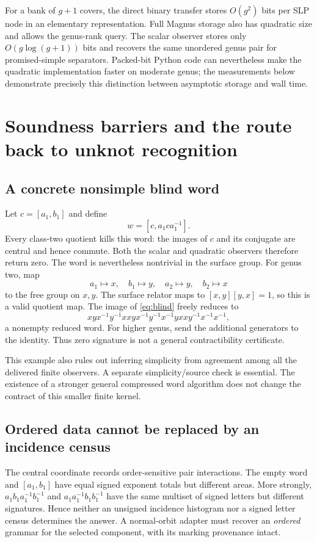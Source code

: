 \documentclass[11pt,letterpaper]{article}
\theoremstyle{definition}
\theoremstyle{remark}
\begin{document}
For a bank of $g+1$ covers, the direct binary transfer stores $O(g^2)$ bits per SLP node in an elementary representation. Full Magnus storage also has quadratic size and allows the genus-rank query. The scalar observer stores only $O(g\log(g+1))$ bits and recovers the same unordered genus pair for promised-simple separators. Packed-bit Python code can nevertheless make the quadratic implementation faster on moderate genus; the measurements below demonstrate precisely this distinction between asymptotic storage and wall time.

\section{Soundness barriers and the route back to unknot recognition}
\label{sec:barriers}
\subsection{A concrete nonsimple blind word}
Let $c=[a_1,b_1]$ and define
\begin{equation}\label{eq:blind}
 w=[c,a_1ca_1^{-1}].
\end{equation}
Every class-two quotient kills this word: the images of $c$ and its conjugate are central and hence commute. Both the scalar and quadratic observers therefore return zero. The word is nevertheless nontrivial in the surface group. For genus two, map
\[
 a_1\mapsto x,\quad b_1\mapsto y,\quad
 a_2\mapsto y,\quad b_2\mapsto x
\]
to the free group on $x,y$. The surface relator maps to $[x,y][y,x]=1$, so this is a valid quotient map. The image of \eqref{eq:blind} freely reduces to
\[
 x y x^{-1} y^{-1} x x y x^{-1} y^{-1} x^{-1}
 y x x y^{-1} x^{-1} x^{-1},
\]
a nonempty reduced word. For higher genus, send the additional generators to the identity. Thus zero signature is not a general contractibility certificate.

This example also rules out inferring simplicity from agreement among all the delivered finite observers. A separate simplicity/source check is essential. The existence of a stronger general compressed word algorithm \cite{clmp} does not change the contract of this smaller finite kernel.

\subsection{Ordered data cannot be replaced by an incidence census}
The central coordinate records order-sensitive pair interactions. The empty word and $[a_1,b_1]$ have equal signed exponent totals but different areas. More strongly, $a_1b_1a_1^{-1}b_1^{-1}$ and $a_1a_1^{-1}b_1b_1^{-1}$ have the same multiset of signed letters but different signatures. Hence neither an unsigned incidence histogram nor a signed letter census determines the answer. A normal-orbit adapter must recover an \emph{ordered} grammar for the selected component, with its marking provenance intact.
\end{document}
